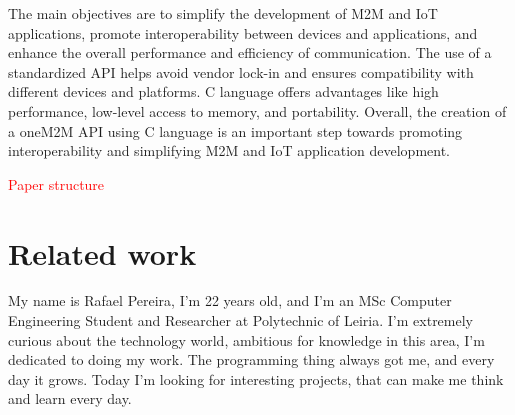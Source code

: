 \documentclass[a4paper,fleqn]{cas-dc}
\begin{document}
The main objectives are to simplify the development of M2M and IoT applications, promote interoperability between devices and applications, and enhance the overall performance and efficiency of communication. The use of a standardized API helps avoid vendor lock-in and ensures compatibility with different devices and platforms. C language offers advantages like high performance, low-level access to memory, and portability. Overall, the creation of a oneM2M API using C language is an important step towards promoting interoperability and simplifying M2M and IoT application development.

\textcolor{red}{Paper structure}

\section{Related work}


\printcredits

%
%




My name is Rafael Pereira, I'm 22 years old, and I'm an MSc Computer Engineering Student and Researcher at Polytechnic of Leiria. I'm extremely curious about the technology world, ambitious for knowledge in this area, I'm dedicated to doing my work. The programming thing always got me, and every day it grows. Today I'm looking for interesting projects, that can make me think and learn every day.
\endbio
\end{document}
